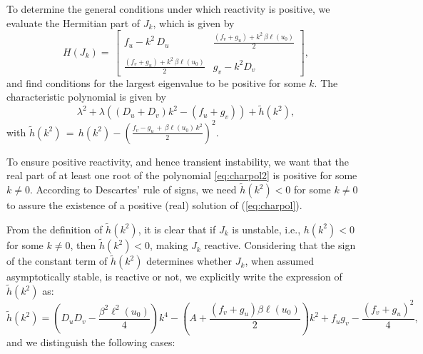 \documentclass{article}
\newcommand{\jac}{J_{k}}
\begin{document}
 To determine the general conditions under which reactivity is positive, we evaluate the Hermitian part of $\jac${, which is given by}
$$
    H\left(\jac\right) = \, \left [ \begin{array}{cc}
         f_u-k^2\, D_u& 
         \frac{(f_v+g_u)+k^2\,\beta \ell(u_0) }{2} \\\\
         \frac{(f_v+g_u)+k^2\, \beta \ell(u_0) }{2} & g_v-k^2 D_v
    \end{array}
    \right],
$$
and find conditions for the largest eigenvalue to be positive for some $k$.
 The characteristic polynomial is given by 
 \begin{equation}
 \label{eq:charpol2}
    \lambda^2 + \lambda \left( \left(D_u+D_v \right)k^2 - \left(f_u+g_v\right) \right) + \tilde h(k^2),
 \end{equation}
with $\tilde h(k^2)\,=\,h(k^2)- \left(\frac{f_v-g_u\,+\, \beta \ell(u_0)\, k^2}{2}\right)^2$.

{To ensure positive reactivity, and hence transient instability,} we want that the real part of at least one root of the  polynomial \eqref{eq:charpol2} is positive for  some $k \neq 0$. According to Descartes' rule of signs, we need \(\tilde h(k^2) < 0\) for some \(k \neq 0\) to assure the existence of a positive (real) solution of (\ref{eq:charpol}).

 From the definition of \(\tilde{h}(k^2)\), it is clear that if \(\jac\) is unstable, i.e., \(h(k^2) < 0\) for some \(k\neq 0\), then \(\tilde{h}(k^2) < 0\), making \(\jac\) reactive. Considering that the sign of the constant term of \(\tilde{h}(k^2)\) determines whether \(\jac\), when assumed asymptotically stable, is reactive or not, we explicitly write the expression of \(\tilde{h}(k^2)\) as:
 $$
    \tilde h(k^2) =  \left(D_u D_v -\frac{\beta^2 \ell^2(u_0)}{4}\right)k^4  - \left(A + \frac{(f_v+g_u)\beta \ell(u_0) }{2}\right) k^2 + f_u g_v -\frac{(f_v+g_u)^2}{4},
    $$
    and we distinguish the following cases:
\end{document}
